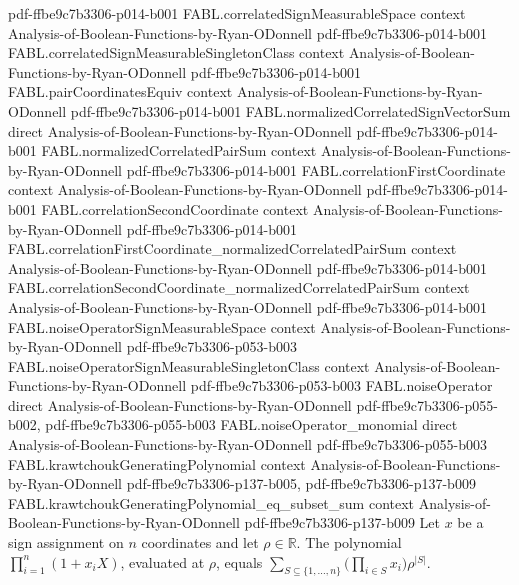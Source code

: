 \begin{theorem}
  {pdf-ffbe9c7b3306-p014-b001}
\proofstep
  {FABL.correlatedSignMeasurableSpace}
  {context}
  {Analysis-of-Boolean-Functions-by-Ryan-ODonnell}
  {pdf-ffbe9c7b3306-p014-b001}
\proofstep
  {FABL.correlatedSignMeasurableSingletonClass}
  {context}
  {Analysis-of-Boolean-Functions-by-Ryan-ODonnell}
  {pdf-ffbe9c7b3306-p014-b001}
\proofstep
  {FABL.pairCoordinatesEquiv}
  {context}
  {Analysis-of-Boolean-Functions-by-Ryan-ODonnell}
  {pdf-ffbe9c7b3306-p014-b001}
\proofstep
  {FABL.normalizedCorrelatedSignVectorSum}
  {direct}
  {Analysis-of-Boolean-Functions-by-Ryan-ODonnell}
  {pdf-ffbe9c7b3306-p014-b001}
\proofstep
  {FABL.normalizedCorrelatedPairSum}
  {context}
  {Analysis-of-Boolean-Functions-by-Ryan-ODonnell}
  {pdf-ffbe9c7b3306-p014-b001}
\proofstep
  {FABL.correlationFirstCoordinate}
  {context}
  {Analysis-of-Boolean-Functions-by-Ryan-ODonnell}
  {pdf-ffbe9c7b3306-p014-b001}
\proofstep
  {FABL.correlationSecondCoordinate}
  {context}
  {Analysis-of-Boolean-Functions-by-Ryan-ODonnell}
  {pdf-ffbe9c7b3306-p014-b001}
\proofstep
  {FABL.correlationFirstCoordinate_normalizedCorrelatedPairSum}
  {context}
  {Analysis-of-Boolean-Functions-by-Ryan-ODonnell}
  {pdf-ffbe9c7b3306-p014-b001}
\proofstep
  {FABL.correlationSecondCoordinate_normalizedCorrelatedPairSum}
  {context}
  {Analysis-of-Boolean-Functions-by-Ryan-ODonnell}
  {pdf-ffbe9c7b3306-p014-b001}
\proofstep
  {FABL.noiseOperatorSignMeasurableSpace}
  {context}
  {Analysis-of-Boolean-Functions-by-Ryan-ODonnell}
  {pdf-ffbe9c7b3306-p053-b003}
\proofstep
  {FABL.noiseOperatorSignMeasurableSingletonClass}
  {context}
  {Analysis-of-Boolean-Functions-by-Ryan-ODonnell}
  {pdf-ffbe9c7b3306-p053-b003}
\proofstep
  {FABL.noiseOperator}
  {direct}
  {Analysis-of-Boolean-Functions-by-Ryan-ODonnell}
  {pdf-ffbe9c7b3306-p055-b002,
    pdf-ffbe9c7b3306-p055-b003}
\proofstep
  {FABL.noiseOperator_monomial}
  {direct}
  {Analysis-of-Boolean-Functions-by-Ryan-ODonnell}
  {pdf-ffbe9c7b3306-p055-b003}
\proofstep
  {FABL.krawtchoukGeneratingPolynomial}
  {context}
  {Analysis-of-Boolean-Functions-by-Ryan-ODonnell}
  {pdf-ffbe9c7b3306-p137-b005,
    pdf-ffbe9c7b3306-p137-b009}
\proofstep
  {FABL.krawtchoukGeneratingPolynomial_eq_subset_sum}
  {context}
  {Analysis-of-Boolean-Functions-by-Ryan-ODonnell}
  {pdf-ffbe9c7b3306-p137-b009}
Let $x$ be a sign assignment on $n$ coordinates and let $\rho\in\mathbb{R}$. The
polynomial $\prod_{i=1}^n(1+x_iX)$, evaluated at $\rho$, equals
$\sum_{S\subseteq\{1,\ldots,n\}}\bigl(\prod_{i\in S}x_i\bigr)\rho^{|S|}$.
\end{theorem}

